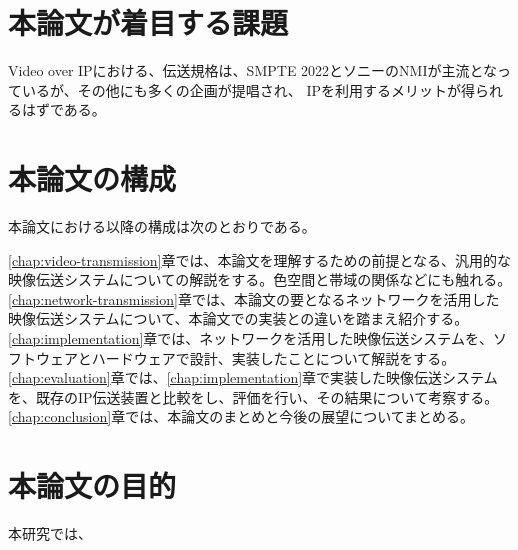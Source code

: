 \section{本論文が着目する課題}
Video over IPにおける、伝送規格は、SMPTE 2022とソニーのNMIが主流となっているが、その他にも多くの企画が提唱され、
IPを利用するメリットが得られるはずである。

\section{本論文の構成}
本論文における以降の構成は次のとおりである。

\ref{chap:video-transmission}章では、本論文を理解するための前提となる、汎用的な映像伝送システムについての解説をする。色空間と帯域の関係などにも触れる。
\ref{chap:network-transmission}章では、本論文の要となるネットワークを活用した映像伝送システムについて、本論文での実装との違いを踏まえ紹介する。
\ref{chap:implementation}章では、ネットワークを活用した映像伝送システムを、ソフトウェアとハードウェアで設計、実装したことについて解説をする。
\ref{chap:evaluation}章では、\ref{chap:implementation}章で実装した映像伝送システムを、既存のIP伝送装置と比較をし、評価を行い、その結果について考察する。
\ref{chap:conclusion}章では、本論文のまとめと今後の展望についてまとめる。

\section{本論文の目的}
本研究では、
